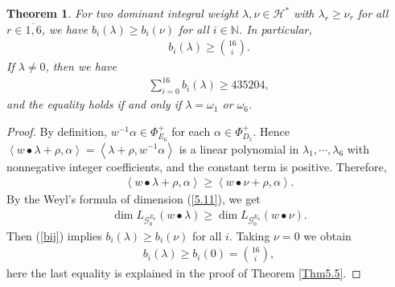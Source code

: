 \documentclass[12pt]{article}
\numberwithin{equation}{section}
\newtheorem{theorem}{Theorem}[section]
\theoremstyle{definition}
\theoremstyle{remark}
\begin{document}
\begin{theorem}
	For two dominant integral weight $\lambda,\nu\in \mathscr{H}^*$ with $\lambda_r\geqslant\nu_r$ for all $r\in\overline{1,6}$, we have $b_i(\lambda)\geqslant b_i(\nu)$ for all $i\in\mathbb{N}$. In particular,
	\begin{eqnarray}
		b_i(\lambda)\geqslant\binom{16}{i}. \label{5.51}
	\end{eqnarray}
	If $\lambda\neq0$, then we have
	\begin{eqnarray}
		\sum_{i=0}^{16}b_i(\lambda)\geqslant 435204, \label{5.52}
	\end{eqnarray}
	and the equality holds if and only if $\lambda=\omega_1$ or $\omega_6$.
\end{theorem}
\begin{proof}
	By definition, $w^{-1}\alpha\in\Phi^+_{E_6}$ for each $\alpha\in\Phi^{+}_{D_5}$. Hence $\left\langle w\bullet\lambda+\rho,\alpha\right\rangle =\left\langle \lambda+\rho, w^{-1}\alpha \right\rangle $ is a linear polynomial in $\lambda_1,\cdots,\lambda_6$  with nonnegative integer coefficients, and the constant term is positive. Therefore,
	\begin{eqnarray}
		\left\langle w\bullet\lambda+\rho,\alpha\right\rangle\geqslant\left\langle w\bullet\nu+\rho,\alpha\right\rangle.
	\end{eqnarray}
	By the Weyl's formula of dimension (\ref{5.11}), we get
	\begin{eqnarray}
		\dim L_{\mathscr{G}_0^{E_6}}(w\bullet\lambda)\geqslant \dim L_{\mathscr{G}_0^{E_6}}(w\bullet\nu).
	\end{eqnarray}
	Then (\ref{bij}) implies $b_{i}(\lambda)\geqslant b_{i}(\nu)$ for all $i$. Taking $\nu=0$ we obtain
	\begin{eqnarray}
		b_i(\lambda)\geqslant b_i(0)=\binom{16}{i}, 
	\end{eqnarray}
	here the last equality is explained in the proof of Theorem \ref{Thm5.5}. 
	

\end{proof}
\end{document}

